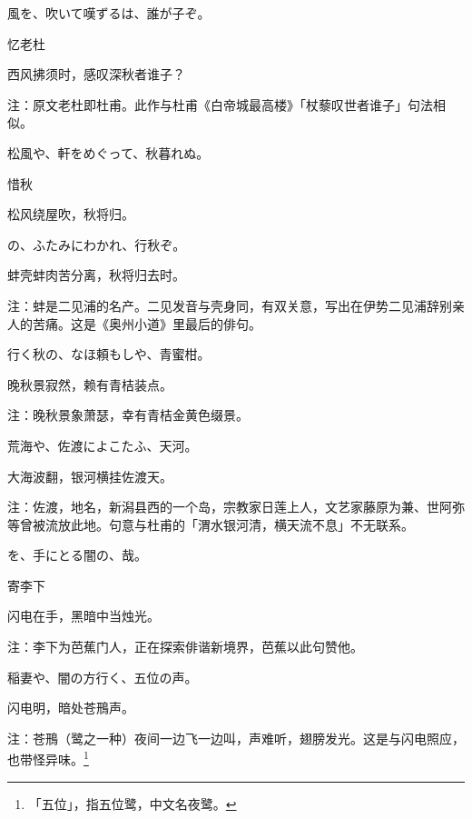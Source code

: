 \begin{haiku}
    {\FH {}風を、吹いて嘆ずるは、誰が子ぞ。}

    {\FK 忆老杜}

    {\FK 西风拂须时，感叹深秋者谁子？}

    {\FT 注：原文老杜即杜甫。此作与杜甫《白帝城最高楼》「杖藜叹世者谁子」句法相似。}
\end{haiku}

\begin{haiku}
    {\FH 松風や、軒をめぐって、秋暮れぬ。}

    {\FK 惜秋}

    {\FK 松风绕屋吹，秋将归。}
\end{haiku}

\begin{haiku}
    {\FH {}の、ふたみにわかれ、行秋ぞ。}

    {\FK 蚌壳蚌肉苦分离，秋将归去时。}

    {\FT 注：蚌是二见浦的名产。二见发音与壳身同，有双关意，写出在伊势二见浦辞别亲人的苦痛。这是《奥州小道》里最后的俳句。}
\end{haiku}

\begin{haiku}
    {\FH 行く秋の、なほ頼もしや、青蜜柑。}

    {\FK 晚秋景寂然，赖有青桔装点。
    }

    {\FT 注：晚秋景象萧瑟，幸有青桔金黄色缀景。}
\end{haiku}

\begin{haiku}
    {\FH 荒海や、佐渡によこたふ、天河。}

    {\FK 大海波翻，银河横挂佐渡天。}

    {\FT 注：佐渡，地名，新潟县西的一个岛，宗教家日莲上人，文艺家藤原为兼、世阿弥等曾被流放此地。句意与杜甫的「渭水银河清，横天流不息」不无联系。}
\end{haiku}

\begin{haiku}
    {\FH {}を、手にとる闇の、哉。}

    {\FK 寄李下}

    {\FK 闪电在手，黑暗中当烛光。}

    {\FT 注：李下为芭蕉门人，正在探索俳谐新境界，芭蕉以此句赞他。}
\end{haiku}

\begin{haiku}
    {\FH 稲妻や、闇の方行く、五位の声。}

    {\FK 闪电明，暗处苍鳽声。}

    {\FT 注：苍鳽（鹭之一种）夜间一边飞一边叫，声难听，翅膀发光。这是与闪电照应，也带怪异味。\footnote{\FT「五位」，指五位鹭，中文名夜鹭。}}
\end{haiku}

